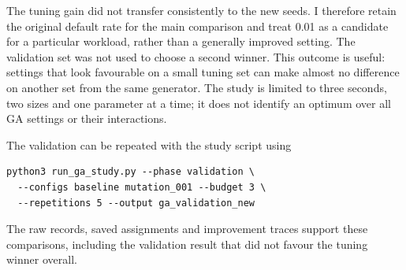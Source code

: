 

The tuning gain did not transfer consistently to the new seeds. I therefore
retain the original default rate for the main comparison and treat 0.01 as
a candidate for a particular workload, rather than a generally improved
setting. The validation set was not used to choose a second winner.
This outcome is useful: settings that look favourable on a small tuning set
can make almost no difference on another set from the same generator.
The study is limited to three seconds, two sizes and one parameter at a time;
it does not identify an optimum over all GA settings or their interactions.

The validation can be repeated with the study script using
\begin{verbatim}
python3 run_ga_study.py --phase validation \
  --configs baseline mutation_001 --budget 3 \
  --repetitions 5 --output ga_validation_new
\end{verbatim}
The raw records, saved assignments and improvement traces support these
comparisons, including the validation result that did not favour the tuning
winner overall.
